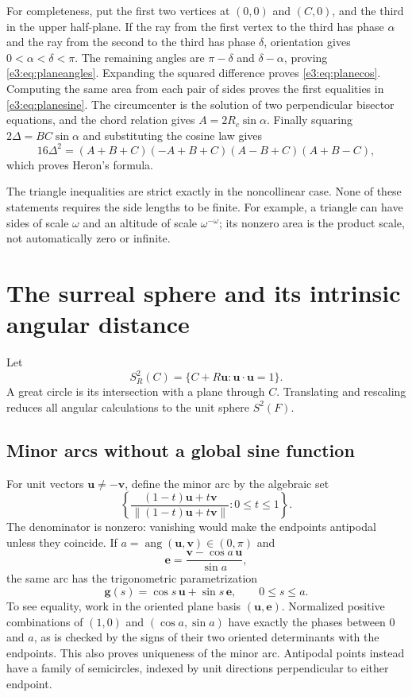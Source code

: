 \documentclass[11pt,letterpaper]{article}
\numberwithin{equation}{section}
\theoremstyle{definition}
\theoremstyle{remark}
\newcommand{\norm}[1]{\left\lVert#1\right\rVert}
\newcommand{\vv}[1]{\bm{#1}}
\newcommand{\ang}{\operatorname{ang}}
\begin{document}
For completeness, put the first two vertices at $(0,0)$ and $(C,0)$, and the
third in the upper half-plane. If the ray from the first vertex to the third
has phase $\alpha$ and the ray from the second to the third has phase
$\delta$, orientation gives $0<\alpha<\delta<\pi$. The remaining angles
are $\pi-\delta$ and $\delta-\alpha$, proving \cref{e3:eq:planeangles}.
Expanding the squared difference proves \cref{e3:eq:planecos}. Computing the
same area from each pair of sides proves the first equalities in
\cref{e3:eq:planesine}. The circumcenter is the solution of two perpendicular
bisector equations, and the chord relation gives $A=2R_c\sin\alpha$.
Finally squaring $2\Delta=BC\sin\alpha$ and substituting the cosine law gives
\[
 16\Delta^2=(A+B+C)(-A+B+C)(A-B+C)(A+B-C),
\]
which proves Heron's formula.

The triangle inequalities are strict exactly in the noncollinear case.
None of these statements requires the side lengths to be finite. For example,
a triangle can have sides of scale $\omega$ and an altitude of scale
$\omega^{-\omega}$; its nonzero area is the product scale, not automatically
zero or infinite.

\section{The surreal sphere and its intrinsic angular distance}\label{e3:sec:sphere}

Let
\[
 S_R^2(C)=\{C+R\vv u:\vv u\cdot\vv u=1\}.
\]
A great circle is its intersection with a plane through $C$. Translating and
rescaling reduces all angular calculations to the unit sphere $S^2(F)$.

\subsection{Minor arcs without a global sine function}

For unit vectors $\vv u\ne-\vv v$, define the minor arc by the algebraic set
\begin{equation}\label{e3:eq:algebraicarc}
 \left\{
 \frac{(1-t)\vv u+t\vv v}{\norm{(1-t)\vv u+t\vv v}}:0\le t\le1
 \right\}.
\end{equation}
The denominator is nonzero: vanishing would make the endpoints antipodal
unless they coincide. If $a=\ang(\vv u,\vv v)\in(0,\pi)$ and
\[
 \vv e=\frac{\vv v-\cos a\,\vv u}{\sin a},
\]
the same arc has the trigonometric parametrization
\begin{equation}\label{e3:eq:arcparam}
 \vv g(s)=\cos s\,\vv u+\sin s\,\vv e,
 \qquad 0\le s\le a.
\end{equation}
To see equality, work in the oriented plane basis $(\vv u,\vv e)$.
Normalized positive combinations of $(1,0)$ and $(\cos a,\sin a)$ have
exactly the phases between $0$ and $a$, as is checked by the signs of their
two oriented determinants with the endpoints. This also proves uniqueness
of the minor arc. Antipodal points instead have a family of semicircles,
indexed by unit directions perpendicular to either endpoint.
\end{document}
